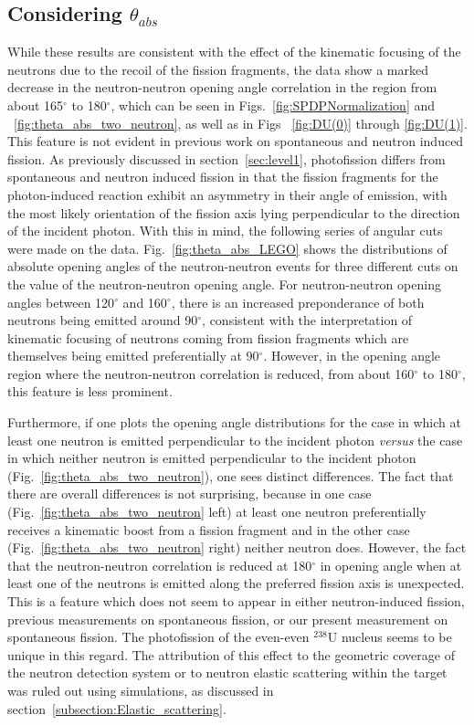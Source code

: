 \subsection{Considering $\theta_{abs}$}
\label{sec:anomaly}
While these results are consistent with the effect of the kinematic focusing of the neutrons due to the recoil of the fission fragments, the data show a marked decrease in the neutron-neutron opening angle correlation in the region from about 165$^{\circ}$ to 180$^{\circ}$, which can be seen in Figs.~\ref{fig:SPDPNormalization} and ~\ref{fig:theta_abs_two_neutron}, as well as in Figs ~\ref{fig:DU(0)} through \ref{fig:DU(1)}.
This feature is not evident in previous work on spontaneous and neutron induced fission.
As previously discussed in section~\ref{sec:level1}, photofission differs from spontaneous and neutron induced fission in that the fission fragments for the photon-induced reaction exhibit an asymmetry in their angle of emission, with the most likely orientation of the fission axis lying perpendicular to the direction of the incident photon.
With this in mind, the following series of angular cuts were made on the data.
Fig.~\ref{fig:theta_abs_LEGO} shows the distributions of absolute opening angles of the neutron-neutron events for three different cuts on the value of the neutron-neutron opening angle.
For neutron-neutron opening angles between 120$^{\circ}$ and 160$^{\circ}$, there is an increased preponderance of both neutrons being emitted around 90$^{\circ}$, consistent with the interpretation of kinematic focusing of neutrons coming from fission fragments which are themselves being emitted preferentially at 90$^{\circ}$.
However, in the opening angle region where the neutron-neutron correlation is reduced, from about 160$^{\circ}$ to 180$^{\circ}$, this feature is less prominent.

Furthermore, if one plots the opening angle distributions for the case in which at least one neutron is emitted perpendicular to the incident photon \emph{versus} the case in which neither neutron is emitted perpendicular to the incident photon (Fig.~\ref{fig:theta_abs_two_neutron}), one sees distinct differences.
The fact that there are overall differences is not surprising, because in one case (Fig.~\ref{fig:theta_abs_two_neutron} left) at least one neutron preferentially receives a kinematic boost from a fission fragment and in the other case (Fig.~\ref{fig:theta_abs_two_neutron} right) neither neutron does.
However, the fact that the neutron-neutron correlation is reduced at 180$^{\circ}$ in opening angle when at least one of the neutrons is emitted along the preferred fission axis is unexpected.
This is a feature which does not seem to appear in either neutron-induced fission, previous measurements on spontaneous fission, or our present measurement on spontaneous fission.
The photofission of the even-even $^{238}$U nucleus seems to be unique in this regard. 
The attribution of this effect to the geometric coverage of the neutron detection system or to neutron elastic scattering within the target was ruled out using simulations, as discussed in section~\ref{subsection:Elastic_scattering}.

